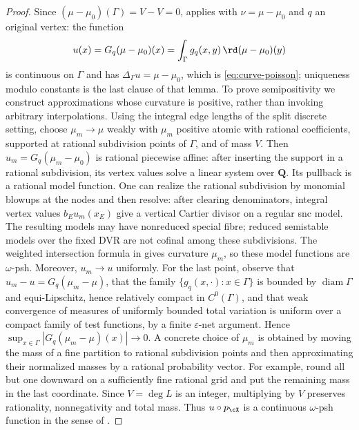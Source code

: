 \begin{proof}
Since $(\mu-\mu_0)(\Gamma)=V-V=0$,  applies
with $\nu=\mu-\mu_0$ and $q$ an original vertex: the function
\[
                u(x)=G_q(\mu-\mu_0)(x)
                    =\int_\Gamma g_q(x,y)\,\rd(\mu-\mu_0)(y)
\]
is continuous on $\Gamma$ and has $\Delta_\Gamma u=\mu-\mu_0$, which is
\eqref{eq:curve-poisson}; uniqueness modulo constants is the last clause of
that lemma.  To prove semipositivity we construct approximations whose curvature
is positive, rather than invoking arbitrary interpolations.  Using
the integral edge lengths of the split discrete setting, choose
$\mu_m\to\mu$ weakly with $\mu_m$ positive atomic with rational coefficients,
supported at rational subdivision points of $\Gamma$, and of mass $V$.
Then $u_m=G_q(\mu_m-\mu_0)$ is rational piecewise affine: after inserting
the support in a rational subdivision, its vertex values solve a linear
system over $\mathbf Q$.  Its pullback is a rational model function.  One can realize the rational
subdivision by monomial blowups at the nodes and then resolve: after
clearing denominators, integral vertex values $b_Eu_m(x_E)$ give a
vertical Cartier divisor on a regular snc model.  The resulting models
may have nonreduced special fibre; reduced semistable models over the
fixed DVR are not cofinal among these subdivisions.  The weighted
intersection formula in  gives curvature
$\mu_m$, so these model functions are $\omega$-psh.  Moreover,
$u_m\to u$ uniformly.  For the last point, observe that
$u_m-u=G_q(\mu_m-\mu)$, that the family
$\{g_q(x,\cdot):x\in\Gamma\}$ is bounded by $\operatorname{diam}\Gamma$
and equi-Lipschitz, hence relatively compact in $C^0(\Gamma)$, and that
weak convergence of measures of uniformly bounded total variation is
uniform over a compact family of test functions, by a finite
$\varepsilon$-net argument.  Hence
$\sup_{x\in\Gamma}|G_q(\mu_m-\mu)(x)|\to0$.  A concrete choice of
$\mu_m$ is obtained by moving the mass of a fine partition to rational
subdivision points and then approximating their normalized masses by a rational probability vector.
For example, round all but one downward on a sufficiently fine rational
grid and put the remaining mass in the last coordinate.  Since
$V=\deg L$ is an integer, multiplying by $V$ preserves rationality,
nonnegativity and total mass.  Thus
$u\circ p_{\cX}$ is a continuous $\omega$-psh function in the sense of
.


\end{proof}
